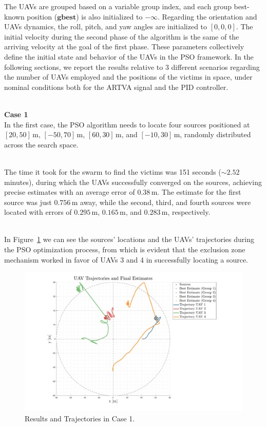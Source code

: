 \documentclass[main]{subfiles}
\begin{document}
The UAVs are grouped based on a variable group index, and 
each group best-known position ($\mathbf{gbest}$) is also 
initialized to \(-\infty\).
Regarding the orientation and UAVs dynamics, the roll, pitch, and yaw angles
are initialized to \([0, 0, 0]\).
The initial velocity during the second phase of the algorithm is the same
of the arriving velocity at the goal of the first phase.
These parameters collectively define the initial state and behavior of the 
UAVs in the PSO framework.
In the following sections, we report the results relative to 3 different 
scenarios regarding the number of UAVs employed and the positions of the victims
in space, under nominal conditions both for the ARTVA signal and the PID controller.

\noindent\\
\textbf{Case 1}\\
In the first case, the PSO algorithm needs to locate four sources positioned 
at \([20, 50] \, \text{m}\), \([-50, 70] \, \text{m}\), \([60, 30] \, \text{m}\), 
and \([-10, 30] \, \text{m}\), 
randomly distributed across the search space.

\noindent\\
The time it took for the swarm to find the victims was 151 seconds (\(\sim 2.52\) minutes),
during which the UAVs successfully converged on the sources, 
achieving precise estimates with an average error of \(0.38 \, \text{m}\). The estimate for the first source was 
just \(0.756 \, \text{m}\) away, while the second, third, and fourth sources were 
located with errors of \(0.295 \, \text{m}\), \(0.165 \, \text{m}\), and \(0.283 \, \text{m}\), respectively.

\noindent\\
In Figure~\ref{fig:case1} we can see  
the sources' locations and the UAVs' trajectories during the PSO 
optimization process, from which is evident that the exclusion zone mechanism
worked in favor of UAVs 3 and 4 in successfully locating a source.

\begin{figure}
    \centering
    \includegraphics[width=1.06\textwidth]{images/case_1.pdf}
    \caption[PSO Case 1]{Results and Trajectories in Case 1.}
    \label{fig:case1}
\end{figure}
\end{document}
